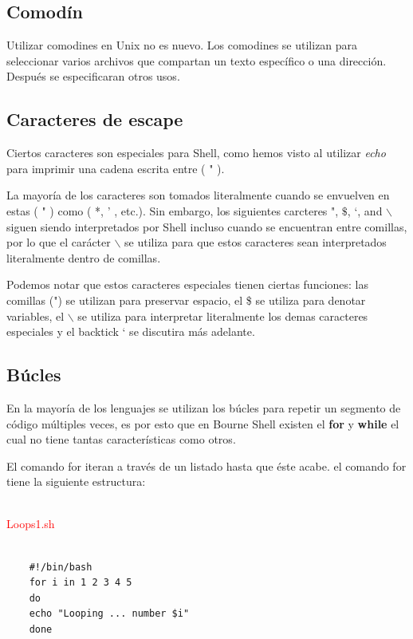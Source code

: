 \documentclass{article}
\begin{document}
\subsection{Comodín}

Utilizar comodines en Unix no es nuevo. Los comodines se utilizan para seleccionar varios archivos que compartan un texto específico o una dirección. Después se especificaran otros usos.

\subsection{Caracteres de escape}

Ciertos caracteres son especiales para Shell, como hemos visto al utilizar \textit{echo} para imprimir una cadena escrita entre ( " ).

La mayoría de los caracteres son tomados literalmente cuando se envuelven en estas ( " ) como ( *, ' , etc.). Sin embargo, los siguientes carcteres ", $\$$, `, and $\backslash$ siguen siendo interpretados por Shell incluso cuando se encuentran entre comillas,
por lo que el carácter $\backslash$ se utiliza para que estos caracteres sean interpretados literalmente dentro de comillas.

Podemos notar que estos caracteres especiales tienen ciertas funciones: las comillas (") se utilizan para preservar espacio, el \$ se utiliza para denotar variables, el $\backslash$ se utiliza para interpretar literalmente los demas caracteres especiales y el backtick ` se discutira más adelante.

\subsection{Búcles}

En la mayoría de los lenguajes se utilizan los búcles para repetir un segmento de código múltiples veces, es por esto que en Bourne Shell existen el \textbf{for} y \textbf{while} el cual no tiene tantas características como otros.

El comando for iteran a través de un listado hasta que éste acabe. el comando for tiene la siguiente estructura:

~\\
\textcolor{red}{Loops1.sh}
\begin{framed}
\begin{verbatim}
	
    #!/bin/bash
    for i in 1 2 3 4 5
    do
    echo "Looping ... number $i"
    done
\end{verbatim}
\end{framed}
\end{document}

